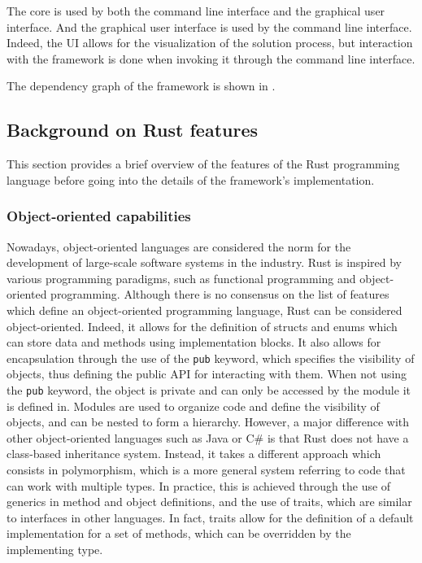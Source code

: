 The core is used by both the command line interface and the graphical user interface. And the graphical user interface is used by the command line interface.
Indeed, the UI allows for the visualization of the solution process, but interaction with the framework is done when invoking it through the command line interface.

The dependency graph of the framework is shown in .


\subsection{Background on Rust features}

This section provides a brief overview of the features of the Rust programming language before going into the details of the framework's implementation.

\subsubsection{Object-oriented capabilities}

Nowadays, object-oriented languages are considered the norm for the development of large-scale software systems in the industry.
Rust is inspired by various programming paradigms, such as functional programming and object-oriented programming.
Although there is no consensus on the list of features which define an object-oriented programming language, Rust can be considered object-oriented.
Indeed, it allows for the definition of structs and enums which can store data and methods using implementation blocks.
It also allows for encapsulation through the use of the \texttt{pub} keyword, which specifies the visibility of objects, thus defining the public API for interacting
with them. When not using the \texttt{pub} keyword, the object is private and can only be accessed by the module it is defined in.
Modules are used to organize code and define the visibility of objects, and can be nested to form a hierarchy.
However, a major difference with other object-oriented languages such as Java or C\# is that Rust does not have a class-based inheritance system.
Instead, it takes a different approach which consists in polymorphism, which is a more general system referring to code that can work with multiple types.
In practice, this is achieved through the use of generics in method and object definitions, and the use of traits, which are similar to interfaces in other languages.
In fact, traits allow for the definition of a default implementation for a set of methods, which can be overridden by the implementing type.

